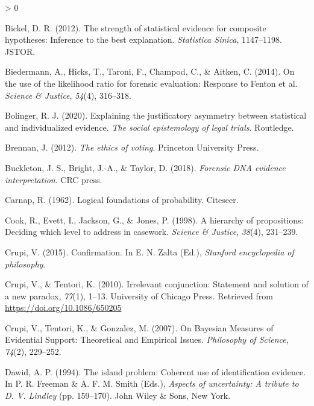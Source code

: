 \documentclass[
  10pt,
  dvipsnames,enabledeprecatedfontcommands]{scrartcl}
\newlength{\cslhangindent}
\newenvironment{CSLReferences}[2] %
 {%
  \setlength{\parindent}{0pt}
  \ifodd #1 \everypar{\setlength{\hangindent}{\cslhangindent}}\ignorespaces\fi
  \ifnum #2 > 0
  \setlength{\parskip}{#2\baselineskip}
  \fi
 }%
 {}
\begin{document}
\begin{CSLReferences}{1}{0}
\leavevmode\hypertarget{ref-bickel2012strength}{}%
Bickel, D. R. (2012). The strength of statistical evidence for composite
hypotheses: Inference to the best explanation. \emph{Statistica Sinica},
1147--1198. JSTOR.

\leavevmode\hypertarget{ref-biedermann2014UseLikelihoodRatio}{}%
Biedermann, A., Hicks, T., Taroni, F., Champod, C., \& Aitken, C.
(2014). On the use of the likelihood ratio for forensic evaluation:
{Response} to {Fenton} et al. \emph{Science \& Justice}, \emph{54}(4),
316--318.

\leavevmode\hypertarget{ref-bolinger2020individualized}{}%
Bolinger, R. J. (2020). Explaining the justificatory asymmetry between
statistical and individualized evidence. \emph{The social epistemology
of legal trials}. Routledge.

\leavevmode\hypertarget{ref-brennan2012ethics}{}%
Brennan, J. (2012). \emph{The ethics of voting}. Princeton University
Press.

\leavevmode\hypertarget{ref-buckleton2018forensic}{}%
Buckleton, J. S., Bright, J.-A., \& Taylor, D. (2018). \emph{Forensic
DNA evidence interpretation}. CRC press.

\leavevmode\hypertarget{ref-carnap1962logical}{}%
Carnap, R. (1962). Logical foundations of probability. Citeseer.

\leavevmode\hypertarget{ref-Cook1998hierarchy}{}%
Cook, R., Evett, I., Jackson, G., \& Jones, P. (1998). A hierarchy of
propositions: Deciding which level to address in casework. \emph{Science
\& Justice}, \emph{38}(4), 231--239.

\leavevmode\hypertarget{ref-crupi2015confirmation}{}%
Crupi, V. (2015). Confirmation. In E. N. Zalta (Ed.), \emph{Stanford
encyclopedia of philosophy}.

\leavevmode\hypertarget{ref-CrupiTentori2010irrelevant}{}%
Crupi, V., \& Tentori, K. (2010). Irrelevant conjunction: Statement and
solution of a new paradox, \emph{77}(1), 1--13. University of Chicago
Press. Retrieved from \url{https://doi.org/10.1086/650205}

\leavevmode\hypertarget{ref-crupi2007BayesianMeasuresEvidential}{}%
Crupi, V., Tentori, K., \& Gonzalez, M. (2007). On {Bayesian Measures}
of {Evidential Support}: {Theoretical} and {Empirical Issues}.
\emph{Philosophy of Science}, \emph{74}(2), 229--252.

\leavevmode\hypertarget{ref-dawid1994island}{}%
Dawid, A. P. (1994). The island problem: Coherent use of identification
evidence. In P. R. Freeman \& A. F. M. Smith (Eds.), \emph{Aspects of
uncertainty: A tribute to {D. V. Lindley}} (pp. 159--170). John Wiley \&
Sons, New York.


\end{CSLReferences}
\end{document}
